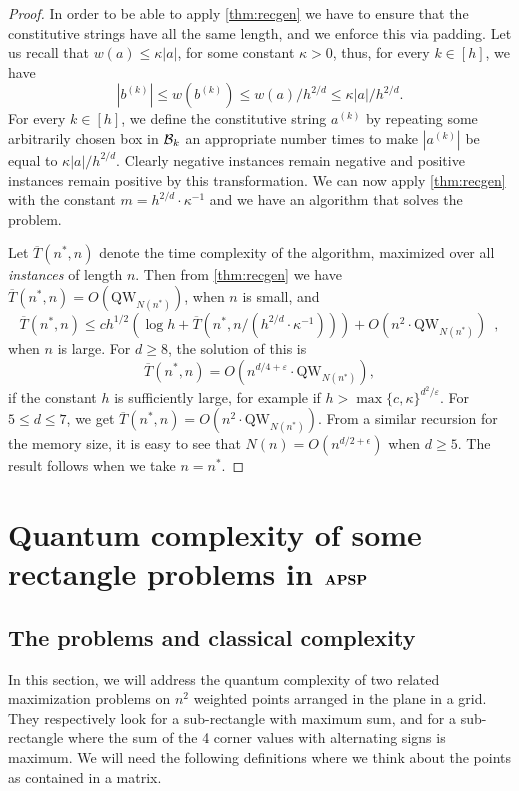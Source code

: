 \documentclass[12pt]{article}
\newcommand{\qw}{\mathrm{QW}}
\newcommand{\APSPc}{\bf{APSP}}
\theoremstyle{definition}
\begin{document}
\begin{proof}
In order to be able to apply \cref{thm:recgen} we have to ensure that the constitutive strings have all the same length, and we enforce this via padding. Let us recall that $w(a) \leq \kappa |a|$, for some constant $\kappa > 0$, thus, for every $k \in [h]$, we have
$$
|b^{(k)}| \leq w(b^{(k)}) \leq w(a)/h^{2/d} \leq \kappa |a|/h^{2/d}.
$$
For every $k \in [h]$, we define the constitutive string $a^{(k)}$ by repeating some arbitrarily chosen box in $ {\cal B}_k$ an appropriate number times to make $|a^{(k)}|$ be equal to $\kappa |a|/h^{2/d}.$ Clearly negative instances remain negative and positive instances remain positive by this transformation.
We can now apply \cref{thm:recgen} with the constant $m = h^{2/d} \cdot \kappa^{-1}$ and we have an algorithm that solves the problem. 

Let $\overline{T}(n^*, n)$ denote the time complexity of the algorithm, maximized over all \emph{instances} of length $n$.
Then from \cref{thm:recgen} we have $\overline{T}(n^*, n) = O(\qw_{N(n^*)})$, when $n$ is small, and 
\[
\overline{T}(n^*, n) \leq c h^{1/2} (\log h + \overline{T}(n^*, n/ (h^{2/d} \cdot \kappa^{-1}))) + O(n^2 \cdot \qw_{N(n^*)})\enspace ,
\]
when $n$ is large.
For $d \geq 8$, the solution of this is
$$
\overline{T}(n^*, n) = O(n^{d/4 + \varepsilon} \cdot \qw_{N(n^*)}),
$$
if the constant $h$ is sufficiently large, for example if $h > \max\{c, \kappa\}^{d^2/\varepsilon}$.
For $5\le d \leq7$, we get $\overline{T}(n^*, n) = O(n^2 \cdot \qw_{N(n^*)})$. From a similar recursion for the memory size, it is easy to see that  $N(n) = O(n^{d/2+\epsilon})$ when $d\ge 5$.
The result follows when we take $n=n^*$.
\end{proof}

\section{Quantum complexity of some rectangle problems in $\APSPc$}
\label{sec:apsp}
\subsection{The problems and classical complexity}
\label{subsec:classical}

In this section, we will address the quantum complexity of two related maximization problems on $n^2$ weighted points arranged in the plane in a grid. 
They respectively look for a sub-rectangle with maximum sum, and for a sub-rectangle where the sum of the 4 corner values with alternating signs is maximum. We will need the following definitions where we think about the points as contained in a matrix.
\end{document}
